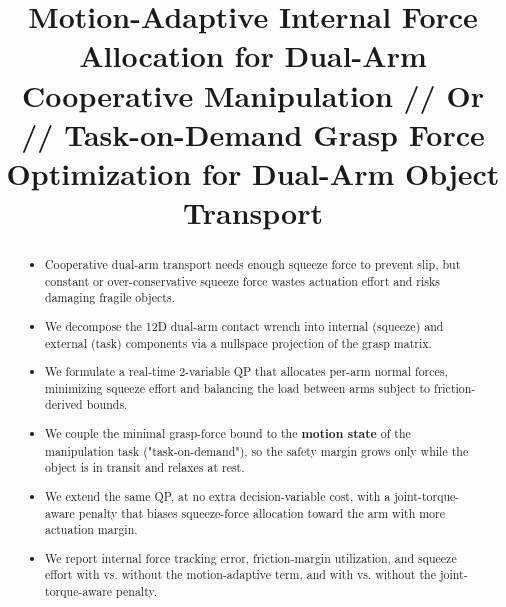 \documentclass[conference]{IEEEtran}
\begin{document}
\title{Motion-Adaptive Internal Force Allocation for Dual-Arm Cooperative Manipulation // Or // Task-on-Demand Grasp Force Optimization for Dual-Arm Object Transport\\

}

\author{
\and
{}
\and
{}
}

\maketitle

\begin{abstract}
\begin{itemize}
    \item Cooperative dual-arm transport needs enough squeeze force to prevent slip, but constant or over-conservative squeeze force wastes actuation effort and risks damaging fragile objects.
    \item We decompose the 12D dual-arm contact wrench into internal (squeeze) and external (task) components via a nullspace projection of the grasp matrix.
    \item We formulate a real-time 2-variable QP that allocates per-arm normal forces, minimizing squeeze effort and balancing the load between arms subject to friction-derived bounds.
    \item We couple the minimal grasp-force bound to the \textbf{motion state} of the manipulation task ("task-on-demand"), so the safety margin grows only while the object is in transit and relaxes at rest.
    \item We extend the same QP, at no extra decision-variable cost, with a joint-torque-aware penalty that biases squeeze-force allocation toward the arm with more actuation margin.
    \item We report internal force tracking error, friction-margin utilization, and squeeze effort with vs. without the motion-adaptive term, and with vs. without the joint-torque-aware penalty.
\end{itemize}
\end{abstract}
\end{document}
